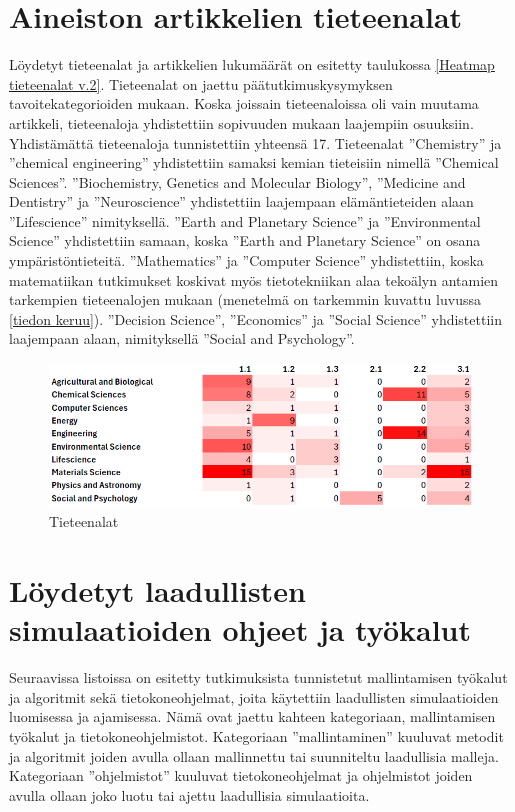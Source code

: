 \documentclass[utf8]{gradu3}
\begin{document}
\section{Aineiston artikkelien tieteenalat} \label{tieteenalat}
Löydetyt tieteenalat ja artikkelien lukumäärät on esitetty taulukossa 
\ref{Heatmap tieteenalat v.2}.
Tieteenalat on jaettu päätutkimuskysymyksen tavoitekategorioiden mukaan.
Koska joissain tieteenaloissa oli vain muutama artikkeli, 
tieteenaloja yhdistettiin sopivuuden mukaan laajempiin osuuksiin.
Yhdistämättä tieteenaloja tunnistettiin yhteensä 17.
Tieteenalat ''Chemistry'' ja ''chemical engineering'' yhdistettiin 
samaksi kemian tieteisiin nimellä ''Chemical Sciences''.
''Biochemistry, Genetics and Molecular Biology'', ''Medicine and Dentistry'' ja ''Neuroscience''
yhdistettiin laajempaan elämäntieteiden alaan ''Lifescience'' nimityksellä.
''Earth and Planetary Science'' ja ''Environmental Science'' yhdistettiin samaan, 
koska ''Earth and Planetary Science'' on osana ympäristöntieteitä.
''Mathematics'' ja ''Computer Science'' yhdistettiin, 
koska matematiikan tutkimukset koskivat myös tietotekniikan alaa tekoälyn 
antamien tarkempien tieteenalojen mukaan 
(menetelmä on tarkemmin kuvattu luvussa \ref{tiedon keruu}).
''Decision Science'', ''Economics'' ja ''Social Science'' yhdistettiin laajempaan alaan,
nimityksellä ''Social and Psychology''.

\begin{figure}[ht]
    \centering
    \includegraphics[width=1.0\linewidth]{Heatmap_v1.PNG}
    \caption{Tieteenalat}
    \label{fig:heatmap_v1}
\end{figure}

\section{Löydetyt laadullisten simulaatioiden ohjeet ja työkalut} \label{tyokalut}
Seuraavissa listoissa on esitetty tutkimuksista tunnistetut mallintamisen työkalut 
ja algoritmit sekä tietokoneohjelmat,
joita käytettiin laadullisten simulaatioiden luomisessa ja ajamisessa. 
Nämä ovat jaettu kahteen kategoriaan, mallintamisen työkalut 
ja tietokoneohjelmistot. 
Kategoriaan ''mallintaminen'' kuuluvat metodit ja algoritmit 
joiden avulla ollaan mallinnettu tai suunniteltu laadullisia malleja.
Kategoriaan ''ohjelmistot'' kuuluvat tietokoneohjelmat ja ohjelmistot 
joiden avulla ollaan joko luotu tai ajettu laadullisia simulaatioita.
\end{document}
